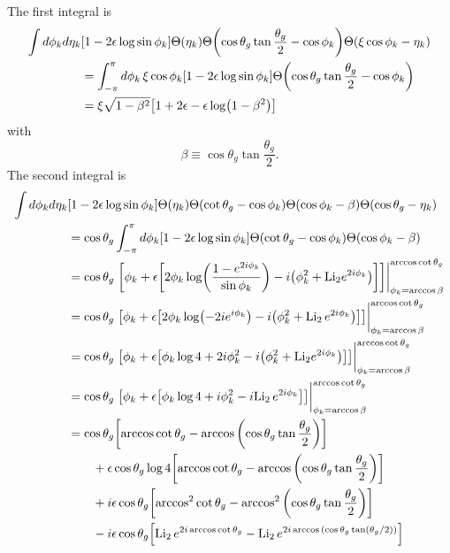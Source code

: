 \documentclass[11pt,twoside,reqno]{amsart}
\theoremstyle{plain}
\theoremstyle{remark}
\theoremstyle{definition}
\theoremstyle{remark}
\theoremstyle{definition}
\theoremstyle{definition}
\newcommand{\Li}{\mathrm{Li}}
\begin{document}
	The first integral is
	\begin{equation}
	\begin{aligned}
		\int d\phi_k d\eta_k &\qty[1 - 2\epsilon\log\sin\phi_k]\Theta(\eta_k)\Theta\qty(\cos\theta_g\tan\frac{\theta_g}{2} - \cos\phi_k)\Theta(\xi\cos\phi_k - \eta_k) \\
		&= \int_{-\pi}^\pi d\phi_k\, \xi \cos\phi_k \qty[1 - 2\epsilon\log\sin\phi_k]\Theta\qty(\cos\theta_g \tan\frac{\theta_g}{2} - \cos\phi_k) \\
		&= \xi \sqrt{1 - \beta^2}\qty[1 + 2\epsilon - \epsilon\log(1 - \beta^2)]
	\end{aligned}
	\end{equation}
	with
	\begin{equation}
		\beta \equiv \cos\theta_g \tan\frac{\theta_g}{2}.
	\end{equation}
	The second integral is
	\begin{equation}
	\begin{aligned}
		\int d\phi_k d\eta_k &\qty[1 - 2\epsilon\log\sin\phi_k]\Theta(\eta_k)\Theta(\cot\theta_g - \cos\phi_k)\Theta\qty(\cos\phi_k - \beta)\Theta(\cos\theta_g - \eta_k) \\
		&= \cos\theta_g \int_{-\pi}^\pi d\phi_k \qty[1 - 2\epsilon\log\sin\phi_k] \Theta(\cot\theta_g - \cos\phi_k)\Theta(\cos\phi_k - \beta) \\
		&= \cos\theta_g \eval{\qty[\phi_k + \epsilon\qty[2\phi_k \log(\frac{1-e^{2i\phi_k}}{\sin\phi_k}) - i\qty(\phi_k^2 + \Li_2e^{2i\phi_k})]]}_{\phi_k = \arccos\beta}^{\arccos\cot\theta_g} \\
		&= \cos\theta_g \eval{\qty[\phi_k + \epsilon\qty[2\phi_k \log(-2i e^{i\phi_k}) - i\qty(\phi_k^2 + \Li_2\,e^{2i\phi_k})]]}_{\phi_k = \arccos\beta}^{\arccos\cot\theta_g} \\
		&= \cos\theta_g \eval{\qty[\phi_k + \epsilon\qty[\phi_k \log4 + 2i\phi_k^2 - i\qty(\phi_k^2 + \Li_2e^{2i\phi_k})]]}_{\phi_k = \arccos\beta}^{\arccos\cot\theta_g} \\
		&= \cos\theta_g \eval{\qty[\phi_k + \epsilon\qty[\phi_k \log4 + i\phi_k^2 - i\Li_2\,e^{2i\phi_k}]]}_{\phi_k = \arccos\beta}^{\arccos\cot\theta_g} \\
		&= \cos\theta_g \qty[\arccos\cot\theta_g - \arccos \qty(\cos\theta_g \tan\frac{\theta_g}{2})] \\
			&\qquad + \epsilon \cos\theta_g \log 4 \qty[\arccos\cot\theta_g - \arccos \qty(\cos\theta_g \tan\frac{\theta_g}{2})] \\
			&\qquad + i \epsilon \cos\theta_g \qty[\arccos^2\cot\theta_g - \arccos^2 \qty(\cos\theta_g \tan\frac{\theta_g}{2})] \\
			&\qquad - i\epsilon\cos\theta_g \qty[\Li_2\,e^{2i\arccos\cot\theta_g} - \Li_2\,e^{2i\arccos\qty(\cos\theta_g\tan(\theta_g/2))}] 
	\end{aligned}
	\end{equation}
\end{document}
